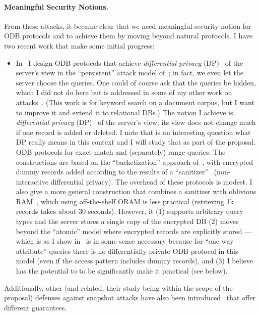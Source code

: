 \paragraph*{Meaningful Security Notions.} 
From these attacks, it became clear that we need meaningful security notion for ODB protocols and to achieve them by moving beyond natural  protocols.
I have two recent work that make some initial progress:
\begin{itemize}
 \item In~\cite{KKNO17} I design ODB protocols that achieve \emph{differential privacy} (DP)~\cite{DMNS06,DKMMN06} of the server's view in the  ``persistent'' attack model of~\cite{CCS:KKNO16}; in fact, we even let the server choose the queries. One could of course ask that the queries be hidden, which I did not do here but is addressed in some of my other work on attacks~\cite{HO18}. (This work is for keyword search on a document corpus, but I want to improve it and extend it to relational DBs.) The  notion I achieve is  \emph{differential privacy} (DP)~\cite{DMNS06,DKMMN06}  of the server's view; its view does not change much if one record is added or deleted. I note that is an interesting question what DP really means in this context and I will study that as part of the proposal. ODB protocols for exact-match and (separately) range queries.   The constructions are  based on the ``bucketization'' approach of~\cite{Hacigumus:2002}, with encrypted dummy records added according to the results of a ``sanitizer''~\cite{STOC:BluLigRot08} (non-interactive differential privacy).  The overhead of these protocols is modest. I also give a more general  construction that combines a sanitizer with oblivious RAM~\cite{Gol87, GO96}, which using off-the-shelf ORAM is less practical (retrieving 1k records takes about 30 seconds).  However, it  (1) supports arbitrary query types and the server stores a single copy of the encrypted DB (2) moves beyond the ``atomic'' model where encrypted records are explicitly stored --- which is as I show in~\cite{KKNO17} is in some sense necessary because for ``one-way attribute'' queries there is no  differentially-private ODB protocol in this model (even if the access pattern includes dummy records), and (3) I believe has the potential to to be significantly make it practical (see below). %
\end{itemize}
Additionally, other (and related, their study being within the scope of the proposal) defenses against snapshot attacks have also been introduced~\cite{EPRINT:PouGriWri17,LP18} that offer different guarantees.
 
